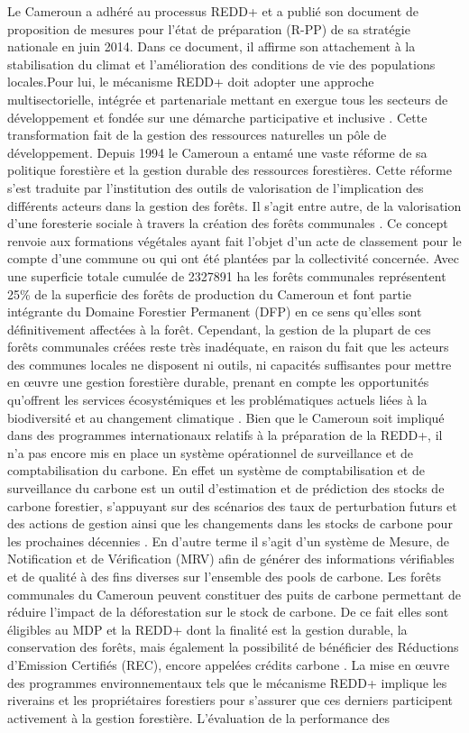 \documentclass[
  12pt,
  a4paper,
  extrafontsizes,
  onecolumn,
  openright]{book}
\theoremstyle{definition}
\theoremstyle{definition}
\theoremstyle{definition}
\theoremstyle{definition}
\theoremstyle{remark}
\begin{document}
\begin{itemize}
  Le Cameroun a adhéré au processus REDD+ et a publié son document de proposition de mesures pour l'état de préparation (R-PP) de sa stratégie nationale en juin 2014. Dans ce document, il affirme son attachement à la stabilisation du climat et l'amélioration des conditions de vie des populations locales.Pour lui, le mécanisme REDD+ doit adopter une approche multisectorielle, intégrée et partenariale mettant en exergue tous les secteurs de développement et fondée sur une démarche participative et inclusive \citep{R-PP2013}. Cette transformation fait de la gestion des ressources naturelles un pôle de développement. Depuis 1994 le Cameroun a entamé une vaste réforme de sa politique forestière et la gestion durable des ressources forestières. Cette réforme s'est traduite par l'institution des outils de valorisation de l'implication des différents acteurs dans la gestion des forêts. Il s'agit entre autre, de la valorisation d'une foresterie sociale à travers la création des forêts communales \citep{Milol2008}. Ce concept renvoie aux formations végétales ayant fait l'objet d'un acte de classement pour le compte d'une commune ou qui ont été plantées par la collectivité concernée. Avec une superficie totale cumulée de 2327891 ha les forêts communales représentent 25\% de la superficie des forêts de production du Cameroun \citep{Anonyme2021i} et font partie intégrante du Domaine Forestier Permanent (DFP) en ce sens qu'elles sont définitivement affectées à la forêt. Cependant, la gestion de la plupart de ces forêts communales créées reste très inadéquate, en raison du fait que les acteurs des communes locales ne disposent ni outils, ni capacités suffisantes pour mettre en œuvre une gestion forestière durable, prenant en compte les opportunités qu'offrent les services écosystémiques et les problématiques actuels liées à la biodiversité et au changement climatique \citep{Anonyme2022b}. Bien que le Cameroun soit impliqué dans des programmes internationaux relatifs à la préparation de la REDD+, il n'a pas encore mis en place un système opérationnel de surveillance et de comptabilisation du carbone. En effet un système de comptabilisation et de surveillance du carbone est un outil d'estimation et de prédiction des stocks de carbone forestier, s'appuyant sur des scénarios des taux de perturbation futurs et des actions de gestion ainsi que les changements dans les stocks de carbone pour les prochaines décennies \citep{Watson2009}. En d'autre terme il s'agit d'un système de Mesure, de Notification et de Vérification (MRV) afin de générer des informations vérifiables et de qualité à des fins diverses sur l'ensemble des pools de carbone. Les forêts communales du Cameroun peuvent constituer des puits de carbone permettant de réduire l'impact de la déforestation sur le stock de carbone. De ce fait elles sont éligibles au MDP et la REDD+ dont la finalité est la gestion durable, la conservation des forêts, mais également la possibilité de bénéficier des Réductions d'Emission Certifiés (REC), encore appelées crédits carbone \citep{Cuny2011}. La mise en œuvre des programmes environnementaux tels que le mécanisme REDD+ implique les riverains et les propriétaires forestiers pour s'assurer que ces derniers participent activement à la gestion forestière. L'évaluation de la performance des 
\end{itemize}
\end{document}
